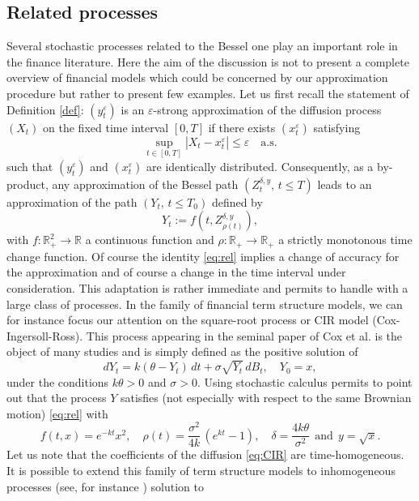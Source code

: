 \documentclass[12pt]{article}
\numberwithin{equation}{section}
\begin{document}
\subsection{Related processes}
Several stochastic processes related to the Bessel one play an important role in the finance literature. Here the aim of the discussion is not to present a complete overview of financial models which could be concerned by our approximation procedure but rather to present few examples. Let us first recall the statement of  Definition \ref{def}:  $(y_t^\varepsilon)$ is an $\varepsilon$-strong approximation of the diffusion process $(X_t)$ on the fixed time interval $[0,T]$ if there exists $(x^\varepsilon_t)$ satisfying
\begin{equation*}
\sup_{t\in[0,T]}|X_t-x^\varepsilon_t|\le \varepsilon\quad\mbox{a.s.}
\end{equation*}
such that $(y^\varepsilon_t)$ and $(x^\varepsilon_t)$ are identically distributed. Consequently, as a by-product, any approximation of the Bessel path $(Z^{\delta,y}_t,\, t\le T)$ leads to an approximation of the path $(Y_t,\,t\le T_0)$ defined by
\begin{equation}\label{eq:rel}
Y_t:=f(t,Z^{\delta,y}_{\rho(t)}),
\end{equation}
with $f:\mathbb{R}_+^2\to \mathbb{R}$ a continuous function and $\rho:\mathbb{R}_+\to\mathbb{R}_+$ a strictly monotonous time change function. Of course the identity \eqref{eq:rel} implies a change of accuracy for the approximation and of course a change in the time interval under consideration. This adaptation is rather immediate and permits to handle with a large class of processes. In the family of financial term structure models, we can for instance focus our attention on the square-root process or CIR model (Cox-Ingersoll-Ross). This process appearing in the seminal paper of Cox et al. \cite{cox1985theory} is the object of many studies and is simply defined as the positive solution of 
\begin{equation}\label{eq:CIR}
dY_t=k(\theta-Y_t)\,dt+\sigma \sqrt{Y_t}\,dB_t,\quad Y_0=x,
\end{equation}
under the conditions $k\theta>0$ and $\sigma>0$. Using stochastic calculus permits to point out that the process $Y$ satisfies (not especially with respect to the same Brownian motion) \eqref{eq:rel} with
\[
f(t,x)=e^{-kt}x^2,\quad \rho(t)=\frac{\sigma^2}{4k}\,(e^{kt}-1),\quad \delta=\frac{4k\theta}{\sigma^2}\ \ \mbox{and}\ \  y=\sqrt{x}.
\]
Let us note that the coefficients of the diffusion \eqref{eq:CIR} are time-homogeneous. It is possible to extend this family of term structure models to inhomogeneous processes (see, for instance \cite{jeanblanc2009mathematical}) solution to
\end{document}

